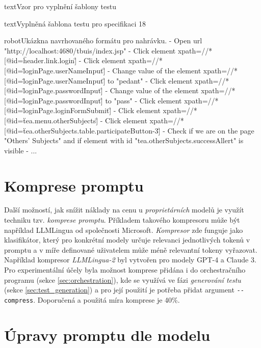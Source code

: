\documentclass[czech, ma, kiv, he, iso690numb, pdf, viewonly]{fasthesis}
\begin{document}
\begin{code}{text}{Vzor pro vyplnění šablony testu \label{lst:template}}
{\begin{code}{text}{Vyplněná šablona testu pro specifikaci 18 \label{lst:spec18}}
{    \begin{code}{robot}{Ukázkna navrhovaného formátu pro nahrávku. \label{lst:proposed_recording}}
- Open url "http://localhost:4680/tbuis/index.jsp"
- Click element xpath=//*[@id=\"header.link.login\"]
- Click element xpath=//*[@id=\"loginPage.userNameInput\"]
- Change value of the element xpath=//*[@id=\"loginPage.userNameInput\"] to "pedant"
- Click element xpath=//*[@id=\"loginPage.passwordInput\"]
- Change value of the element xpath=//*[@id=\"loginPage.passwordInput\"] to "pass"
- Click element xpath=//*[@id=\"loginPage.loginFormSubmit\"]
- Click element xpath=//*[@id=\"tea.menu.otherSubjects\"]
- Click element xpath=//*[@id=\"tea.otherSubjects.table.participateButton-3\"]
- Check if we are on the page "Others' Subjects" and if element with id "tea.otherSubjects.successAllert" is visible
    - ...\end{code}

    \section{Komprese promptu}

    Další možností, jak snížit náklady na cenu u \emph{proprietárních} modelů je využít techniku tzv. \textit{komprese promptu}. Příkladem takového kompresoru může být například LLMLingua od společnosti Microsoft. \cite{jiang2023llmlingua, pan2024llmlingua2} \textit{Kompresor} zde funguje jako klasifikátor, který pro konkrétní modely určuje relevanci jednotlivých tokenů v promptu a v míře definované uživatelem může méně relevantní tokeny vyřazovat. Například kompresor \textit{LLMLingua-2} byl vytvořen pro modely GPT-4 a Claude 3. Pro experimentální účely byla možnost komprese přidána i do orchestračního programu (sekce \ref{sec:orchestration}), kde se využívá ve fázi \textit{generování testu} (sekce \ref{sec:test_generation}) a pro její použití je potřeba přidat argument \verb|--compress|. Doporučená a použitá míra komprese je 40\%.

    \section{Úpravy promptu dle modelu}

}
\end{code}}
\end{code}
\end{document}
